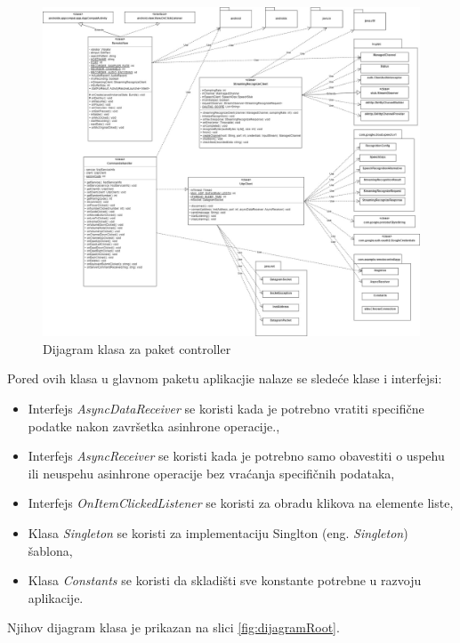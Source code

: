 \documentclass[implementacija.tex]{subfiles}
\begin{document}
\begin{figure}[!ht]
  \centering
  \includegraphics[width=\textwidth,height=0.65\paperheight]{Implementacija/dijagrami/controller_package_class_diagram.jpg}
  \caption{Dijagram klasa za paket controller}
  \label{fig:dijagramController}
\end{figure}



Pored ovih klasa u glavnom paketu aplikacjie nalaze se sledeće klase i interfejsi:
\begin{itemize}
\item Interfejs \textit{AsyncDataReceiver} se koristi kada je potrebno vratiti specifične podatke nakon završetka asinhrone operacije.,
\item Interfejs \textit{AsyncReceiver} se koristi kada je potrebno samo obavestiti o uspehu ili neuspehu asinhrone operacije bez vraćanja specifičnih podataka,
\item Interfejs \textit{OnItemClickedListener} se koristi za obradu klikova na elemente liste,
\item Klasa \textit{Singleton} se koristi za implementaciju Singlton (eng. \textit{Singleton}) šablona,
\item Klasa \textit{Constants} se koristi da skladišti sve konstante potrebne u razvoju aplikacije.
\end{itemize}
Njihov dijagram klasa je prikazan na slici \ref{fig:dijagramRoot}.
\end{document}
